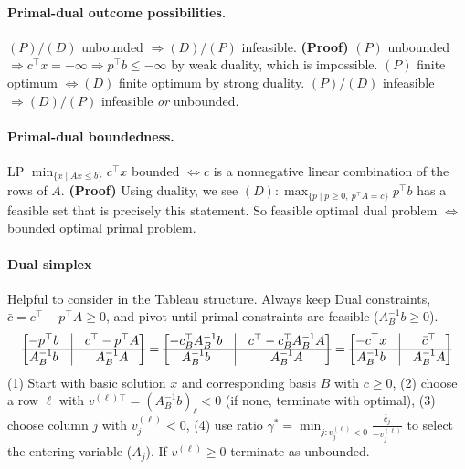 \documentclass{article}
\begin{document}
\paragraph{Primal-dual outcome possibilities.} $(P) / (D)$ unbounded $\Rightarrow (D) / (P)$ infeasible. \textbf{(Proof)} $(P)$ unbounded $\Rightarrow c^\top x = -\infty \Rightarrow p^\top b \leq -\infty$ by weak duality, which is impossible. $(P)$ finite optimum $\iff (D)$ finite optimum by strong duality. $(P) / (D)$ infeasible $\Rightarrow (D) / (P)$ infeasible \textit{or} unbounded.

\paragraph{Primal-dual boundedness.} LP $\min_{\{x \mid Ax\leq b\}}c^\top x$ bounded $\iff c$ is a nonnegative linear combination of the rows of $A$. \textbf{(Proof)} Using duality, we see $(D): \max_{\{p \mid p \geq 0,\ p^\top A = c\}} p^\top b$ has a feasible set that is precisely this statement. So feasible optimal dual problem $\iff$ bounded optimal primal problem. 



\paragraph{Dual simplex}
Helpful to consider in the Tableau structure. Always keep Dual constraints, $\bar c = c^\top  - p^\top A \geq 0$, and pivot until primal constraints are feasible ($A_B^{-1}b \geq 0$). 
\begin{align*}
    \begin{bmatrix}
        -p^\top b & \vline& c^\top  - p^\top A\\
        \hline
        A_B^{-1}b & \vline & A_B^{-1}A
    \end{bmatrix} = 
    \begin{bmatrix}
        -c_B^\top A_B^{-1}b & \vline& c^\top  - c_B^\top A_B^{-1}A\\
        \hline
        A_B^{-1}b & \vline & A_B^{-1}A
    \end{bmatrix} = \begin{bmatrix}
        -c^\top x & \vline& \bar c^\top\\
        \hline
        A_B^{-1}b & \vline & A_B^{-1}A\\
    \end{bmatrix}
\end{align*}
(1) Start with basic solution $x$ and corresponding basis $B$ with $\bar c \geq 0$, 
(2) choose a row $\ell$ with $v^{(\ell)\top}=(A_B^{-1}b)_\ell < 0$ (if none, terminate with optimal),
(3) choose column $j$ with $v^{(\ell)}_j < 0$,
(4) use ratio $\gamma^* = \min_{j : v^{(\ell)}_j < 0} \frac{\bar c_j}{-v^{(\ell)}_j}$ to select the entering variable ($A_j$). If $v^{(\ell)}\geq 0$ terminate as unbounded.
\end{document}
